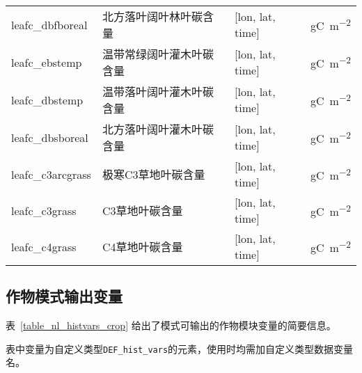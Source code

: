 {\begin{longtable}[htbp]{lp{}ll}
leafc\_dbfboreal & 北方落叶阔叶林叶碳含量 & {[}lon, lat, time{]} & \unit{gC.m^{-2}} \\
leafc\_ebstemp & 温带常绿阔叶灌木叶碳含量 & {[}lon, lat, time{]} & \unit{gC.m^{-2}} \\
leafc\_dbstemp & 温带落叶阔叶灌木叶碳含量 & {[}lon, lat, time{]} & \unit{gC.m^{-2}} \\
leafc\_dbsboreal & 北方落叶阔叶灌木叶碳含量 & {[}lon, lat, time{]} & \unit{gC.m^{-2}} \\
leafc\_c3arcgrass & 极寒C3草地叶碳含量 & {[}lon, lat, time{]} & \unit{gC.m^{-2}} \\
leafc\_c3grass & C3草地叶碳含量 & {[}lon, lat, time{]} & \unit{gC.m^{-2}} \\
leafc\_c4grass & C4草地叶碳含量 & {[}lon, lat, time{]} & \unit{gC.m^{-2}} \\
\end{longtable}}

\subsection{作物模式输出变量}\label{sec_hist_vars_crop}

表~\ref{table_nl_histvars_crop} 给出了模式可输出的作物模块变量的简要信息。\par
表中变量为自定义类型\texttt{DEF\_hist\_vars}的元素，使用时均需加自定义类型数据变量名。

